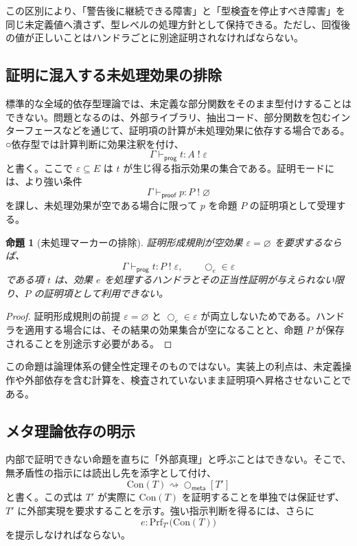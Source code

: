 \documentclass[a4paper,11pt]{ltjsarticle}
\theoremstyle{definition}
\theoremstyle{plain}
\newtheorem{proposition}[definition]{命題}
\newcommand{\dfix}{\bigcirc}
\newcommand{\Prf}{\mathrm{Prf}}
\newcommand{\Con}{\mathrm{Con}}
\begin{document}
この区別により、「警告後に継続できる障害」と「型検査を停止すべき障害」を同じ未定義値へ潰さず、型レベルの処理方針として保持できる。ただし、回復後の値が正しいことはハンドラごとに別途証明されなければならない。

\subsection{証明に混入する未処理効果の排除}

標準的な全域的依存型理論では、未定義な部分関数をそのまま型付けすることはできない。問題となるのは、外部ライブラリ、抽出コード、部分関数を包むインターフェースなどを通じて、証明項の計算が未処理効果に依存する場合である。○依存型では計算判断に効果注釈を付け、
\[
 \Gamma\vdash_{\mathsf{prog}}t:A\;!\;\varepsilon
\]
と書く。ここで $\varepsilon\subseteq E$ は $t$ が生じ得る指示効果の集合である。証明モードには、より強い条件
\[
 \Gamma\vdash_{\mathsf{proof}}p:P\;!\;\varnothing
\]
を課し、未処理効果が空である場合に限って $p$ を命題 $P$ の証明項として受理する。

\begin{proposition}[未処理マーカーの排除]
証明形成規則が空効果 $\varepsilon=\varnothing$ を要求するならば、
\[
 \Gamma\vdash_{\mathsf{prog}}t:P\;!\;\varepsilon,
 \qquad
 \dfix_e\in\varepsilon
\]
である項 $t$ は、効果 $e$ を処理するハンドラとその正当性証明が与えられない限り、$P$ の証明項として利用できない。
\end{proposition}

\begin{proof}
証明形成規則の前提 $\varepsilon=\varnothing$ と $\dfix_e\in\varepsilon$ が両立しないためである。ハンドラを適用する場合には、その結果の効果集合が空になることと、命題 $P$ が保存されることを別途示す必要がある。
\end{proof}

この命題は論理体系の健全性定理そのものではない。実装上の利点は、未定義操作や外部依存を含む計算を、検査されていないまま証明項へ昇格させないことである。

\subsection{メタ理論依存の明示}

内部で証明できない命題を直ちに「外部真理」と呼ぶことはできない。そこで、無矛盾性の指示には読出し先を添字として付け、
\[
 \Con(T)\rightsquigarrow
 \dfix_{\mathsf{meta}}[T']
\]
と書く。この式は $T'$ が実際に $\Con(T)$ を証明することを単独では保証せず、$T'$ に外部実現を要求することを示す。強い指示判断を得るには、さらに
\[
 e:\Prf_{T'}\bigl(\Con(T)\bigr)
\]
を提示しなければならない。
\end{document}
